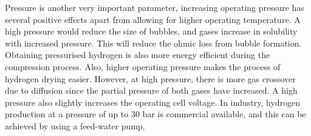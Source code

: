 Pressure is another very important parameter, increasing operating pressure has several positive effects apart from allowing for higher operating temperature.  A high pressure would reduce the size of bubbles, and gases increase in solubility with increased pressure. This will reduce the ohmic loss from bubble formation. Obtaining pressurised hydrogen is also more energy efficient during the compression process. Also, higher operating pressure makes the process of hydrogen drying easier. However, at high pressure, there is more gas crossover due to diffusion since the partial pressure of both gases have increased. A high pressure also slightly increases the operating cell voltage. In industry, 
hydrogen production at a pressure of up to 30 bar is  commercial available, and this can be achieved by using a feed-water pump.\cite{gibbs}


